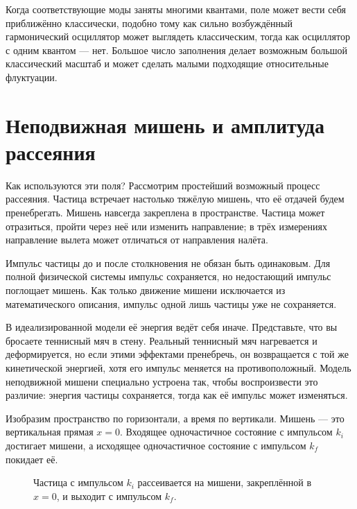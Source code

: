 Когда соответствующие моды заняты многими квантами, поле может вести себя приближённо классически, подобно тому как сильно возбуждённый гармонический осциллятор может выглядеть классическим, тогда как осциллятор с одним квантом — нет. Большое число заполнения делает возможным большой классический масштаб и может сделать малыми подходящие относительные флуктуации.


\section{Неподвижная мишень и амплитуда рассеяния}

Как используются эти поля? Рассмотрим простейший возможный процесс рассеяния. Частица встречает настолько тяжёлую мишень, что её отдачей будем пренебрегать. Мишень навсегда закреплена в пространстве. Частица может отразиться, пройти через неё или изменить направление; в трёх измерениях направление вылета может отличаться от направления налёта.

Импульс частицы до и после столкновения не обязан быть одинаковым. Для полной физической системы импульс сохраняется, но недостающий импульс поглощает мишень. Как только движение мишени исключается из математического описания, импульс одной лишь частицы уже не сохраняется.

В идеализированной модели её энергия ведёт себя иначе. Представьте, что вы бросаете теннисный мяч в стену. Реальный теннисный мяч нагревается и деформируется, но если этими эффектами пренебречь, он возвращается с той же кинетической энергией, хотя его импульс меняется на противоположный. Модель неподвижной мишени специально устроена так, чтобы воспроизвести это различие: энергия частицы сохраняется, тогда как её импульс может изменяться.

Изобразим пространство по горизонтали, а время по вертикали. Мишень — это вертикальная прямая \(x=0\). Входящее одночастичное состояние с импульсом \(k_i\) достигает мишени, а исходящее одночастичное состояние с импульсом \(k_f\) покидает её.

\begin{figure}[h]
\centering
{}
\caption{Частица с импульсом \(k_i\) рассеивается на мишени, закреплённой в \(x=0\), и выходит с импульсом \(k_f\).}
\end{figure}

